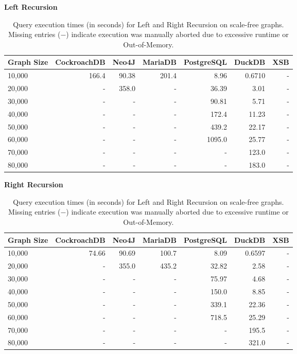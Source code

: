 \documentclass[varwidth=12in]{standalone}
\begin{document}
\begin{table}[htpb]
\centering
\caption*{Query execution times (in seconds) for Left and Right Recursion on scale-free graphs. Missing entries ($-$) indicate execution was manually aborted due to excessive runtime or Out-of-Memory.}
\label{tab:scale_free_side_by_side}

\begin{minipage}[t]{0.48\textwidth}
\centering
\textbf{Left Recursion}

\vspace{0.2cm}
\begin{tabular}{lrrrrrr}
\toprule
\textbf{Graph Size} & \textbf{CockroachDB} & \textbf{Neo4J} & \textbf{MariaDB} & \textbf{PostgreSQL} & \textbf{DuckDB} & \textbf{XSB} \\
\midrule
10,000 & 166.4 & 90.38 & 201.4 & 8.96 & 0.6710 & - \\
20,000 & - & 358.0 & - & 36.39 & 3.01 & - \\
30,000 & - & - & - & 90.81 & 5.71 & - \\
40,000 & - & - & - & 172.4 & 11.23 & - \\
50,000 & - & - & - & 439.2 & 22.17 & - \\
60,000 & - & - & - & 1095.0 & 25.77 & - \\
70,000 & - & - & - & - & 123.0 & - \\
80,000 & - & - & - & - & 183.0 & - \\
\bottomrule
\end{tabular}
\end{minipage}\hfill
\begin{minipage}[t]{0.48\textwidth}
\centering
\textbf{Right Recursion}

\vspace{0.2cm}
\begin{tabular}{lrrrrrr}
\toprule
\textbf{Graph Size} & \textbf{CockroachDB} & \textbf{Neo4J} & \textbf{MariaDB} & \textbf{PostgreSQL} & \textbf{DuckDB} & \textbf{XSB} \\
\midrule
10,000 & 74.66 & 90.69 & 100.7 & 8.09 & 0.6597 & - \\
20,000 & - & 355.0 & 435.2 & 32.82 & 2.58 & - \\
30,000 & - & - & - & 75.97 & 4.68 & - \\
40,000 & - & - & - & 150.0 & 8.85 & - \\
50,000 & - & - & - & 339.1 & 22.36 & - \\
60,000 & - & - & - & 718.5 & 25.29 & - \\
70,000 & - & - & - & - & 195.5 & - \\
80,000 & - & - & - & - & 321.0 & - \\
\bottomrule
\end{tabular}
\end{minipage}

\end{table}
\end{document}
